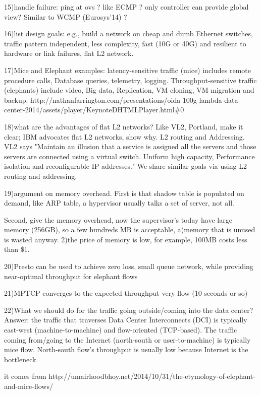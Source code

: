 15)handle failure: ping at ovs ? like ECMP ? only controller can provide global view? Similar to WCMP (Eurosys'14) ?

16)list design goals: e.g., build a network on cheap and dumb Ethernet switches, traffic pattern independent, less complexity, fast (10G or 40G) and resilient to hardware or link failures, flat L2 network.

17)Mice and Elephant examples: latency-sensitive traffic (mice) includes remote procedure calls, Database queries, 
telemetry, logging. Throughput-sensitive traffic (elephants) include video, Big data, Replication, VM cloning, VM migration and backup.
http://nathanfarrington.com/presentations/oida-100g-lambda-data-center-2014/assets/player/KeynoteDHTMLPlayer.html\#0

18)what are the advantages of flat L2 networks? Like VL2, Portland, 
make it clear; IBM advocates flat L2 networks, show why. L2 routing and Addressing. 
VL2 says "Maintain an illusion that a service is assigned all the servers and 
those servers are connected using a virtual switch. 
Uniform high capacity, Performance isolation and reconfigurable IP addresses."
We share similar goals via using L2 routing and addressing.

19)argument on memory overhead. First is that shadow table is populated on demand, like ARP table, a hypervisor usually
talks a set of server, not all.

Second, give the memory overhead, now the supervisor's today have large memory (256GB), so a few hundreds MB is acceptable, 
a)memory that is unused is wasted anyway. 2)the price of memory is low, for example, 100MB costs less than \$1.
 
20)Presto can be used to achieve zero loss, small queue network, while providing near-optimal throughput for elephant flows

21)MPTCP converges to the expected throughput very flow (10 seconds or so)

22)What we should do for the traffic going outside/coming into the data center? Answer: the traffic that traverses Data Center Interconnects (DCI) is typically east-west (machine-to-machine) and flow-oriented (TCP-based). The traffic coming
from/going to the Internet (north-south or user-to-machine) is typically mice flow.
North-south flow's throughput is usually low because Internet is the bottleneck.

it comes from 
http://umairhoodbhoy.net/2014/10/31/the-etymology-of-elephant-and-mice-flows/

